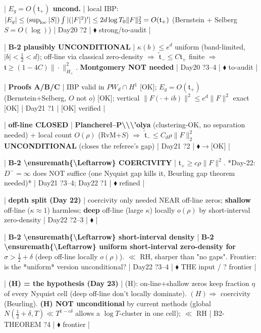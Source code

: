 \documentclass[10pt]{article}
\begin{document}
| \textbf{$E_g=O(\mathfrak t_+)$ uncond.} | local IBP: $|E_g|\le(\sup_{\rm loc}|S|)\int|(|F|^2)'|\le2d\log T_0\|F\|_2^2=O(\mathfrak t_+)$ (Bernstein + Selberg $S=O(\log)$) | Day20 ?2 | $\blacklozenge$ strong/to-audit |\par
| \textbf{B-2 plausibly UNCONDITIONAL} | $\kappa(b)\le e^d$ uniform (band-limited, $|b|<\tfrac12<d$); off-line via classical zero-density \ensuremath{\Rightarrow} $\widetilde{\mathfrak t}_-\le C\mathfrak t_+$ finite \ensuremath{\Rightarrow} $\mathfrak t\ge(1-4C)\|\cdot\|^2_{H_+}$. \textbf{Montgomery NOT needed} | Day20 ?3--4 | $\blacklozenge$ to-audit |\par
| \textbf{Proofs A/B/C} | IBP valid in $PW_d\cap H^1$ [OK]; $E_g=O(\mathfrak t_+)$ (Bernstein+Selberg, $O$ not $o$) [OK]; vertical $\|F(\cdot+ib)\|^2\le e^d\|F\|^2$ exact [OK] | Day21 ?1 | [OK] verified |\par
| \textbf{off-line CLOSED} | \textbf{Plancherel--P\textbackslash{}\textbackslash{}\textbackslash{}'olya} (clustering-OK, no separation needed) + local count $O(\rho)$ (RvM+$S$) \ensuremath{\Rightarrow} $\widetilde{\mathfrak t}_-\le C_d\rho\|F\|_2^2$ \textbf{UNCONDITIONAL} (closes the referee's gap) | Day21 ?2 | $\blacklozenge$\ensuremath{\to}[OK] |\par
| \textbf{B-2 \textbackslash{}ensuremath\{\textbackslash{}Leftarrow\} COERCIVITY} | $\mathfrak t_+\ge c\rho\|F\|^2$. *Day-22: $D^-=\infty$ does NOT suffice (one Nyquist gap kills it, Beurling gap theorem needed)* | Day21 ?3--4; Day22 ?1 | $\blacklozenge$ refined |\par
| \textbf{depth split (Day 22)} | coercivity only needed NEAR off-line zeros; \textbf{shallow} off-line ($\kappa\approx1$) harmless; \textbf{deep} off-line (large $\kappa$) locally $o(\rho)$ by short-interval zero-density | Day22 ?2--3 | $\blacklozenge$ |\par
| \textbf{B-2 \textbackslash{}ensuremath\{\textbackslash{}Leftarrow\} short-interval density} | \textbf{B-2 \textbackslash{}ensuremath\{\textbackslash{}Leftarrow\} uniform short-interval zero-density for $\sigma>\tfrac12+\delta$} (deep off-line locally $o(\rho)$). \ensuremath{\ll} RH, sharper than "no gaps". Frontier: is the *uniform* version unconditional? | Day22 ?3--4 | $\blacklozenge$ THE input / ? frontier |\par
| \textbf{(H) = the hypothesis (Day 23)} | (H): on-line+shallow zeros keep fraction $\eta$ of every Nyquist cell (deep off-line don't locally dominate). $(H)\Rightarrow$ coercivity (Beurling). \textbf{(H) NOT unconditional} by current methods (global $N(\tfrac12+\delta,T)\ll T^{1-c\delta}$ allows a $\log T$-cluster in one cell); \ensuremath{\ll} RH | B2-THEOREM ?4 | $\blacklozenge$ frontier |\par
\end{document}
